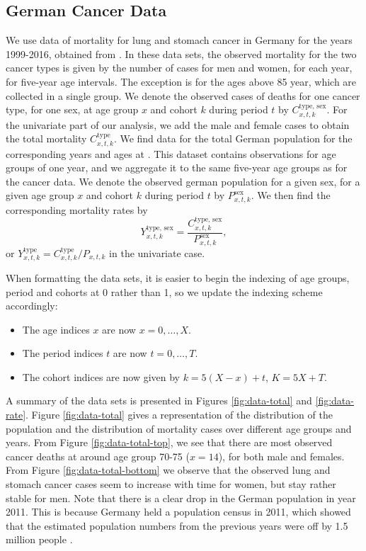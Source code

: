 \subsection{German Cancer Data}
\label{sec:GermanCancerData}
We use data of mortality for lung and stomach cancer in Germany for the years 1999-2016, obtained from \textcite{cancerData}. In these data sets, the observed mortality for the two cancer types is given by the number of cases for men and women, for each year, for five-year age intervals. The exception is for the ages above 85 year, which are collected in a single group. We denote the observed cases of deaths for one cancer type, for one sex, at age group $x$ and cohort $k$ during period $t$ by $C_{x,t,k}^{\text{type, sex}}$. For the univariate part of our analysis, we add the male and female cases to obtain the total mortality $C_{x,t,k}^{\text{type}}$. We find data for the total German population for the corresponding years and ages at \textcite{germanPopulation}. This dataset contains observations for age groups of one year, and we aggregate it to the same five-year age groups as for the cancer data. We denote the observed german population for a given sex, for a given age group $x$ and cohort $k$ during period $t$ by $P_{x,t,k}^{\text{sex}}$. We then find the corresponding mortality rates by
\begin{equation}
    Y_{x,t,k}^{\text{type, sex}} = \frac{C_{x,t,k}^{\text{type, sex}}}{P_{x,t,k}^{\text{sex}}},
\end{equation}
or $Y_{x,t,k}^{\text{type}} = C_{x,t,k}^{\text{type}}/P_{x,t,k}$ in the univariate case.

\newpar When formatting the data sets, it is easier to begin the indexing of age groups, period and cohorts at 0 rather than 1, so we update the indexing scheme accordingly:
\begin{itemize}
    \item The age indices $x$ are now $x = 0,\ldots,X$.
    \item The period indices $t$ are now $t = 0, \ldots, T$.
    \item The cohort indices are now given by $k = 5(X - x) + t$, $K = 5X + T$.
\end{itemize}

\newpar A summary of the data sets is presented in Figures \ref{fig:data-total} and \ref{fig:data-rate}. Figure \ref{fig:data-total} gives a representation of the distribution of the population and the distribution of mortality cases over different age groups and years. From Figure \ref{fig:data-total-top}, we see that there are most observed cancer deaths at around age group 70-75 ($x = 14$), for both male and females. From Figure \ref{fig:data-total-bottom} we observe that the observed lung and stomach cancer cases seem to increase with time for women, but stay rather stable for men. Note that there is a clear drop in the German population in year 2011. This is because Germany held a population census in 2011, which showed that the estimated population numbers from the previous years were off by 1.5 million people \parencite{germanCensus}.


